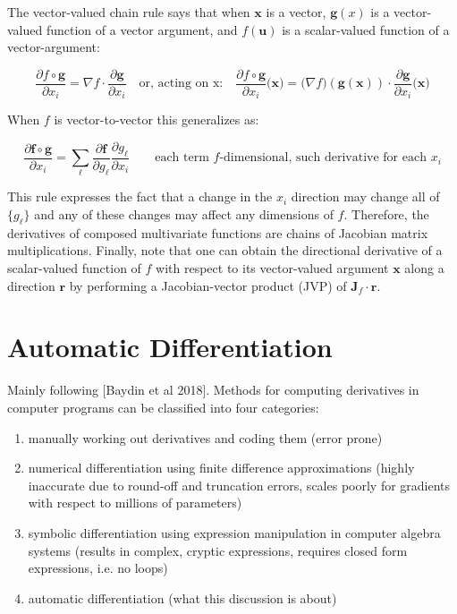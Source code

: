 \documentclass[11pt]{article}
\theoremstyle{definition}
\theoremstyle{plain}
\renewcommand{\v}[1]{\mathbf{#1}}
\begin{document}
\noindent The vector-valued chain rule says that when
$\v{x}$ is a vector, $\v{g}(x)$ is a vector-valued function of a vector argument, and
$f(\v{u})$ is a scalar-valued function of a vector-argument:

$$ \frac{\partial f \circ \v{g}}{\partial x_i} = 
\nabla f  \cdot \frac{\partial \v{g}}{\partial x_i} 
\quad \text{or, acting on x:} \quad
\frac{\partial f \circ \v{g}}{\partial x_i}\big( \v{x} \big) = 
\big(\nabla f\big) (\v{g}(\v{x}))  \cdot \frac{\partial \v{g}}{\partial x_i} \big( \v{x} \big)
$$

\noindent When $f$ is vector-to-vector this generalizes as:

$$ \frac{\partial \v{f} \circ \v{g}}{\partial x_i} = 
\sum_{\ell} \frac{\partial \v{f}}{\partial g_\ell}
\frac{\partial g_\ell}{\partial x_i} \quad \quad \text{each term $f$-dimensional, such derivative for each $x_i$} $$

\noindent This rule expresses the fact that a change in the $x_i$ 
direction may change all of $\{g_\ell\}$ and any of these changes may affect any
dimensions of $f$. Therefore, the derivatives of composed multivariate functions 
are chains of Jacobian matrix multiplications. Finally, note that one can obtain the directional
derivative of a scalar-valued function of $f$ with respect to its vector-valued argument
$\v{x}$ along a direction $\v{r}$ by performing a Jacobian-vector product (JVP) of
$\v{J}_f \cdot \v{r}$.

\newpage

\section{Automatic Differentiation}

\noindent Mainly following [Baydin et al 2018].
Methods for computing derivatives in computer programs can be classified into four categories:

\begin{enumerate}
    \item manually working out derivatives and coding them (error prone)
    \item numerical differentiation using finite difference approximations
          (highly inaccurate due to round-off and truncation errors, scales
          poorly for gradients with respect to millions of parameters)
    \item symbolic differentiation using expression manipulation in 
          computer algebra systems (results in complex, cryptic expressions,
          requires closed form expressions, i.e. no loops) 
    \item automatic differentiation (what this discussion is about)
\end{enumerate}
\end{document}
